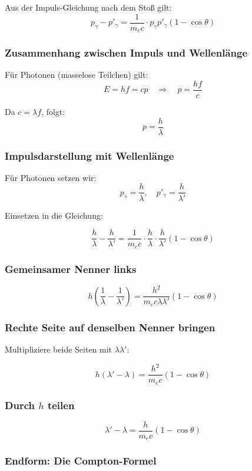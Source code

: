 Aus der Impuls-Gleichung nach dem Stoß gilt:
\[
p_\gamma - p'_\gamma = \frac{1}{m_e c} \cdot p_\gamma p'_\gamma (1 - \cos\theta)
\]

\subsubsection*{Zusammenhang zwischen Impuls und Wellenlänge}

Für Photonen (masselose Teilchen) gilt:
\[
E = h f = c p \quad \Rightarrow \quad p = \frac{h f}{c}
\]

Da \( c = \lambda f \), folgt:
\[
p = \frac{h}{\lambda}
\]


\subsubsection*{ Impulsdarstellung mit Wellenlänge}

Für Photonen setzen wir:
\[
p_\gamma = \frac{h}{\lambda}, \quad p'_\gamma = \frac{h}{\lambda'}
\]

Einsetzen in die Gleichung:

\[
\frac{h}{\lambda} - \frac{h}{\lambda'} = \frac{1}{m_e c} \cdot \frac{h}{\lambda} \cdot \frac{h}{\lambda'} (1 - \cos\theta)
\]

\subsubsection*{Gemeinsamer Nenner links}

\[
h \left( \frac{1}{\lambda} - \frac{1}{\lambda'} \right) = \frac{h^2}{m_e c \lambda \lambda'} (1 - \cos\theta)
\]

\subsubsection*{ Rechte Seite auf denselben Nenner bringen}

Multipliziere beide Seiten mit \( \lambda \lambda' \):

\[
h (\lambda' - \lambda) = \frac{h^2}{m_e c} (1 - \cos\theta)
\]

\subsubsection*{Durch \( h \) teilen}

\[
\lambda' - \lambda = \frac{h}{m_e c} (1 - \cos\theta)
\]

\subsubsection*{Endform: Die Compton-Formel}

